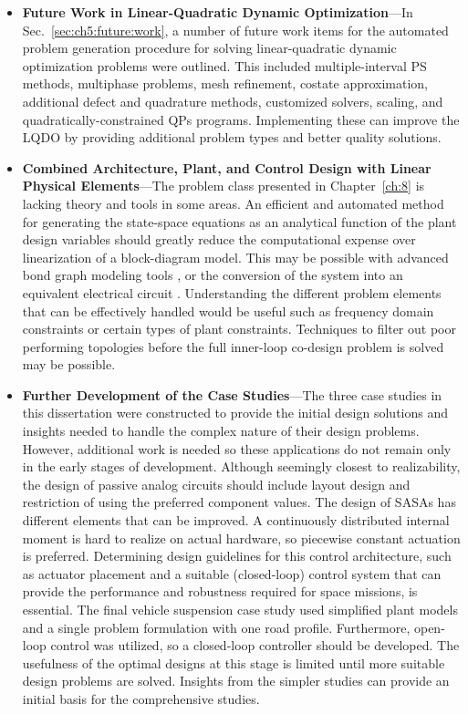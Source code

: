 \begin{itemize}
\item \textbf{Future Work in Linear-Quadratic Dynamic Optimization}---In Sec.~\ref{sec:ch5:future:work}, a number of future work items for the automated problem generation procedure for solving linear-quadratic dynamic optimization problems were outlined. 
This included multiple-interval PS methods, multiphase problems, mesh refinement, costate approximation, additional defect and quadrature methods, customized  solvers, scaling, and quadratically-constrained QPs programs.
Implementing these can improve the LQDO by providing additional problem types and better quality solutions. 

\item \textbf{Combined Architecture, Plant, and Control Design with Linear Physical Elements}---The problem class presented in Chapter~\ref{ch:8} is lacking theory and tools in some areas. 
An efficient and automated method for generating the state-space equations as an analytical function of the plant design variables should greatly reduce the computational expense over linearization of a block-diagram model.
This may be possible with advanced bond graph modeling tools \cite{Granda1997a, Kleijn2017a}, or the conversion of the system into an equivalent electrical circuit \cite{SysAnal2004a}.
Understanding the different problem elements that can be effectively handled would be useful such as frequency domain constraints or certain types of plant constraints.
Techniques to filter out poor performing topologies before the full inner-loop co-design problem is solved may be possible. 

\item \textbf{Further Development of the Case Studies}---The three case studies in this dissertation were constructed to provide the initial design solutions and insights needed to handle the complex nature of their design problems.
However, additional work is needed so these applications do not remain only in the early stages of development.
Although seemingly closest to realizability, the design of passive analog circuits should include layout design and restriction of using the preferred component values.
The design of SASAs has different elements that can be improved. 
A continuously distributed internal moment is hard to realize on actual hardware, so piecewise constant actuation is preferred.
Determining design guidelines for this control architecture, such as actuator placement and a suitable (closed-loop) control system that can provide the performance and robustness required for space missions, is essential.
The final vehicle suspension case study used simplified plant models and a single problem formulation with one road profile. Furthermore, open-loop control was utilized, so a closed-loop controller should be developed.
The usefulness of the optimal designs at this stage is limited until more suitable design problems are solved.
Insights from the simpler studies can provide an initial basis for the comprehensive studies. 

\end{itemize}